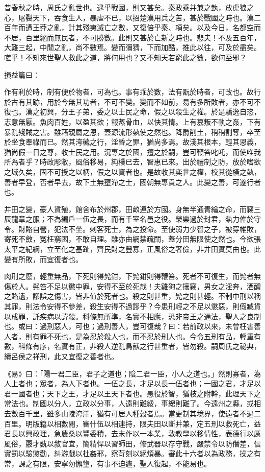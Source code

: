 \begin{pinyinscope}
昔春秋之時，周氏之亂世也。逮乎戰國，則又甚矣。秦政乘并兼之埶，放虎狼之心，屠裂天下，吞食生人，暴虐不已，以招楚漢用兵之苦，甚於戰國之時也。漢二百年而遭王莽之亂，計其殘夷滅亡之數，又復倍乎秦、項矣。以及今日，名都空而不居，百里絕而無民者，不可勝數。此則又甚於亡新之時也。悲夫！不及五百年，大難三起，中閒之亂，尚不數焉。變而彌猜，下而加酷，推此以往，可及於盡矣。嗟乎！不知來世聖人救此之道，將何用也？又不知天若窮此之數，欲何至邪？

損益篇曰：

作有利於時，制有便於物者，可為也。事有乖於數，法有翫於時者，可改也。故行於古有其跡，用於今無其功者，不可不變。變而不如前，易有多所敗者，亦不可不復也。漢之初興，分王子弟，委之以士民之命，假之以殺生之權。於是驕逸自恣，志意無厭。魚肉百姓，以盈其欲；報蒸骨血，以快其情。上有篡叛不軌之姦，下有暴亂殘賊之害。雖藉親屬之恩，蓋源流形埶使之然也。降爵削土，稍稍割奪，卒至於坐食奉祿而已。然其洿穢之行，淫昏之罪，猶尚多焉。故淺其根本，輕其恩義，猶尚假一日之尊，收士民之用。況專之於國，擅之於嗣，豈可鞭笞叱吒，而使唯我所為者乎？時政彫敝，風俗移易，純樸已去，智惠已來。出於禮制之防，放於嗜欲之域久矣，固不可授之以柄，假之以資者也。是故收其奕世之權，校其從橫之埶，善者早登，否者早去，故下土無壅滯之士，國朝無專貴之人。此變之善，可遂行者也。

井田之變，豪人貨殖，館舍布於州郡，田畝連於方國。身無半通青綸之命，而竊三辰龍章之服；不為編戶一伍之長，而有千室名邑之役。榮樂過於封君，埶力侔於守令。財賂自營，犯法不坐。刺客死士，為之投命。至使弱力少智之子，被穿帷敗，寄死不斂，冤枉窮困，不敢自理。雖亦由網禁疏闊，蓋分田無限使之然也。今欲張太平之紀綱，立至化之基趾，齊民財之豐寡，正風俗之奢儉，非井田實莫由也。此變有所敗，而宜復者也。

肉刑之廢，輕重無品，下死則得髡鉗，下髡鉗則得鞭笞。死者不可復生，而髡者無傷於人。髡笞不足以懲中罪，安得不至於死哉！夫雞狗之攘竊，男女之淫奔，酒醴之賂遺，謬誤之傷害，皆非值於死者也。殺之則甚重，髡之則甚輕。不制中刑以稱其罪，則法令安得不參差，殺生安得不過謬乎？今患刑輕之不足以懲惡，則假臧貨以成罪，託疾病以諱殺。科條無所準，名實不相應，恐非帝王之通法，聖人之良制也。或曰：過刑惡人，可也；過刑善人，豈可復哉？曰：若前政以來，未曾枉害善人者，則有罪不死也，是為忍於殺人也，而不忍於刑人也。今令五刑有品，輕重有數，科條有序，名實有正，非殺人逆亂鳥獸之行甚重者，皆勿殺。嗣周氏之祕典，續呂侯之祥刑，此又宜復之善者也。

《易》曰：「陽一君二臣，君子之道也；陰二君一臣，小人之道也。」然則寡者，為人上者也；眾者，為人下者也。一伍之長，才足以長一伍者也；一國之君，才足以君一國者也；天下之王，才足以王天下者也。愚役於智，猶枝之附幹，此理天下之常法也。制國以分人，立政以分事，人遠則難綏，事總則難了。今遠州之縣，或相去數百千里，雖多山陵洿澤，猶有可居人種穀者焉。當更制其境界，使遠者不過二百里。明版籍以相數閱，審什伍以相連持，限夫田以斷并兼，定五刑以救死亡，益君長以興政理，急農桑以豐委積，去末作以一本業，敦教學以移情性，表德行以厲風俗，覈才蓺以敘官宜，簡精悍以習師田，修武器以存守戰，嚴禁令以防僭差，信實罰以驗懲勸，糾游戲以杜姦邪，察苛刻以絕煩暴。審此十六者以為政務，操之有常，課之有限，安寧勿懈墯，有事不迫遽，聖人復起，不能易也。


\end{pinyinscope}
